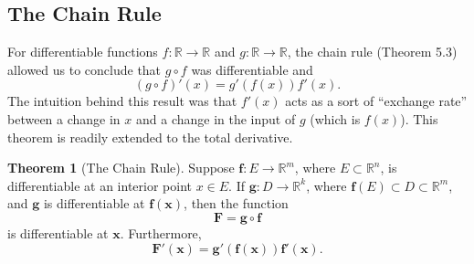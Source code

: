 \documentclass{article}
\newcommand{\R}{\mathbb{R}}
\newcommand{\x}{\mathbf{x}}
\newcommand{\f}{\mathbf{f}}
\theoremstyle{definition}
\newtheorem{theorem}{Theorem}[section]
\begin{document}
	\subsection{The Chain Rule}
	For differentiable functions $ f:\R\to\R $ and $ g:\R\to\R $, the chain rule (Theorem 5.3) allowed us to conclude that $ g\circ f $ was differentiable and $$ (g\circ f)'(x)=g'(f(x))f'(x).$$ The intuition behind this result was that $ f'(x) $ acts as a sort of ``exchange rate'' between a change in $ x $ and a change in the input of $ g $ (which is $ f(x) $). This theorem is readily extended to the total derivative.
	\begin{theorem}[The Chain Rule]
		Suppose $ \f:E\to\R^m $, where $ E\subset \R^n $, is differentiable at an interior point $ x\in E $. If $ \mathbf g:D\to \R^k $, where $ \f(E)\subset D\subset \R^m $, and $ \mathbf g $ is differentiable at $ \f(\x) $, then the function $$\mathbf F=\mathbf g \circ \f $$ is differentiable at $ \x$. Furthermore, 
		$$ \mathbf F'(\x)= \mathbf g'(\f(\x))\f'(\x).$$
	\end{theorem}
\end{document}
